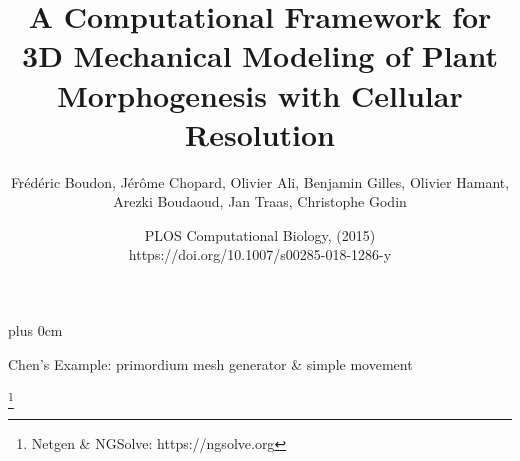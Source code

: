 \documentclass[9pt,UTF8,aspectratio=43]{beamer}
\title{A Computational Framework for 3D Mechanical Modeling of Plant Morphogenesis with Cellular Resolution}
\subtitle{}
\author{
Fr\'ed\'eric Boudon, J\'er\^ome Chopard, Olivier Ali, Benjamin Gilles, Olivier Hamant,
Arezki Boudaoud, Jan Traas, Christophe Godin
}
\institute{}
\date{
  PLOS Computational Biology, (2015) \\
  https://doi.org/10.1007/s00285-018-1286-y
}
\renewcommand{\raggedright}{\leftskip=0pt \rightskip=0pt plus 0cm}
\begin{document}

\raggedright
\setlength{\leftmargini}{8pt}


\begin{frame}{Chen's Example: primordium mesh generator \& simple movement}
\begin{figure}[!htbp]
\centering
{}
\end{figure}
\begin{figure}[!htbp]
\centering
{}
\end{figure}
\footnote{Netgen \& NGSolve: https://ngsolve.org}
\end{frame}
\end{document}
